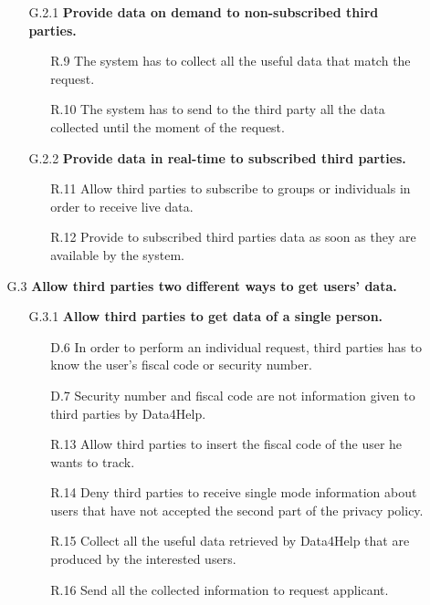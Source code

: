 \begin{enumerate}
\begin{enumerate}
		\begin{enumerate} 
		\item [G.2.1] \textbf{Provide data on demand to non-subscribed third parties.}
		\begin{enumerate} 

		\item [R.9] The system has to collect all the useful data that match the request.
		\item [R.10] The system has to send to the third party all the data collected until the moment of the request.
    	\end{enumerate}	
    	
    	\item [G.2.2] \textbf{Provide data in real-time to subscribed third parties.}
		\begin{enumerate}
    	\item [R.11] Allow third parties to subscribe to groups or individuals in order to receive live data.
    	\item [R.12] Provide to subscribed third parties data as soon as they are available by the system.
    	\end{enumerate}
    	\end{enumerate}
    
	\item [G.3] \textbf{Allow third parties two different ways to get users' data.}
		\begin{enumerate}     
    	\item [G.3.1] \textbf{Allow third parties to get data of a single person.}
		\begin{enumerate}
		\item [D.6] In order to perform an individual request, third parties has to know the user's fiscal code or security number.
		\item [D.7] Security number and fiscal code are not information given to third parties by Data4Help.
    	\item [R.13] Allow third parties to insert the fiscal code of the user he wants to track.
    	\item [R.14] Deny third parties to receive single mode information about users that have not accepted the second part of the privacy policy.
    	\item [R.15] Collect all the useful data retrieved by Data4Help that are produced by the interested users. 
    	\item [R.16] Send all the collected information to request applicant.
    	\end{enumerate}
    

\end{enumerate}
\end{enumerate}
\end{enumerate}
